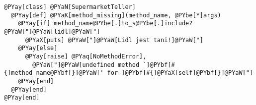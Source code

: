 \begin{Verbatim}[commandchars=@\[\]]
@PYay[class] @PYaN[SupermarketTeller]
  @PYay[def] @PYaK[method_missing](method_name, @PYbe[*]args)
    @PYay[if] method_name@PYbe[.]to_s@PYbe[.]include? @PYaW["]@PYaW[lidl]@PYaW["]
      @PYaX[puts] @PYaW["]@PYaW[Lidl jest tani!]@PYaW["]
    @PYay[else]
      @PYay[raise] @PYaq[NoMethodError],
        @PYaW["]@PYaW[undefined method `]@PYbf[#{]method_name@PYbf[}]@PYaW[' for ]@PYbf[#{]@PYaX[self]@PYbf[}]@PYaW["]
    @PYay[end]
  @PYay[end]
@PYay[end]
\end{Verbatim}
